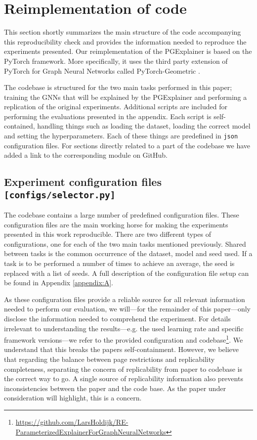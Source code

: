 \section{Reimplementation of code}\label{sec:3}
This section shortly summarizes the main structure of the code accompanying this reproducibility check and provides the information needed to reproduce the experiments presented. Our reimplementation of the PGExplainer is based on the PyTorch \cite{PyTorch} framework. More specifically, it uses the third party extension of PyTorch for Graph Neural Networks called PyTorch-Geometric \cite{PyTorch-Geometric}. 

The codebase is structured for the two main tasks performed in this paper; training the GNNs that will be explained by the PGExplainer and performing a replication of the original experiments. Additional scripts are included for performing the evaluations presented in the appendix. Each script is self-contained, handling things such as loading the dataset, loading the correct model and setting the hyperparameters. Each of these things are predefined in \texttt{json} configuration files. For sections directly related to a part of the codebase we have added a link to the corresponding module on GitHub. 

\subsection{Experiment configuration files \hfill \texttt{[configs/selector.py]}}
The codebase contains a large number of predefined configuration files. These configuration files are the main working horse for making the experiments presented in this work reproducible. There are two different types of configurations, one for each of the two main tasks mentioned previously. Shared between tasks is the common occurrence of the dataset, model and seed used. If a task is to be performed a number of times to achieve an average, the seed is replaced with a list of seeds. A full description of the configuration file setup can be found in Appendix \ref{appendix:A}. 

As these configuration files provide a reliable source for all relevant information needed to perform our evaluation, we will---for the remainder of this paper---only disclose the information needed to comprehend the experiment. For details irrelevant to understanding the results---e.g. the used learning rate and specific framework versions---we refer to the provided configuration and codebase\footnote{\url{https://github.com/LarsHoldijk/RE-ParameterizedExplainerForGraphNeuralNetworks}}. We understand that this breaks the papers self-containment. However, we believe that regarding the balance between page restrictions and replicability completeness, separating the concern of replicability from paper to codebase is the correct way to go. A single source of replicability information also prevents inconsistencies between the paper and the code base. As the paper under consideration will highlight, this is a concern.
